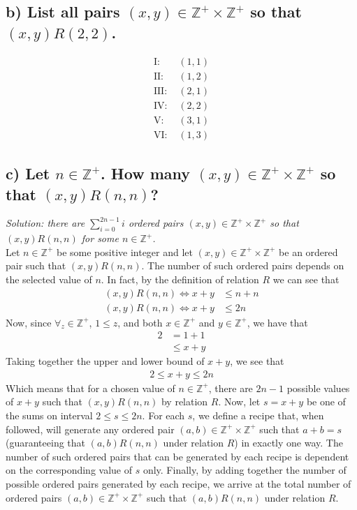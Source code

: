 \documentclass[11pt, letterpaper]{article}
\begin{document}
\subsection*{b) List all pairs $(x,y)\in\mathbb{Z^+}\times\mathbb{Z^+}$ so that $(x,y)R(2,2)$.}
\begin{align*}
    \text{I: } &(1,1)\\
    \text{II: } &(1,2)\\
    \text{III: } &(2,1)\\
    \text{IV: } &(2,2)\\
    \text{V: } &(3,1)\\
    \text{VI: } &(1,3)
\end{align*}
\subsection*{c) Let $n\in\mathbb{Z^+}$. How many $(x,y)\in\mathbb{Z^+}\times\mathbb{Z^+}$ so that $(x,y)R(n,n)$?}
{\large\it Solution: there are $\sum_{i=0}^{2n-1}i$ ordered pairs $(x,y)\in\mathbb{Z^+}\times\mathbb{Z^+}$ so that $(x,y)R(n,n)$ for some $n\in\mathbb{Z^+}$.}\\[0.25cm]
Let $n\in\mathbb{Z^+}$ be some positive integer and let $(x,y)\in\mathbb{Z^+}\times\mathbb{Z^+}$ be an ordered pair such that $(x,y)R(n,n)$. The number of such ordered pairs depends on the selected value of $n$. In fact, by the definition of relation $R$ we can see that
\begin{align*}
    (x,y)R(n,n)\iff x+y&\leq n+n\\
    (x,y)R(n,n)\iff x+y&\leq 2n
\end{align*}
Now, since $\forall_z\in\mathbb{Z^+}$, $1\leq z$, and both $x\in\mathbb{Z^+}$ and $y\in\mathbb{Z^+}$, we have that
\begin{align*}
    2&= 1+1\\
    &\leq x+y
\end{align*} 
Taking together the upper and lower bound of $x+y$, we see that
\begin{align*}
    2\leq x+y\leq 2n
\end{align*}
Which means that for a chosen value of $n\in\mathbb{Z^+}$, there are $2n-1$ possible values of $x+y$ such that $(x,y)R(n,n)$ by relation $R$.
Now, let $s=x+y$ be one of the sums on interval $2\leq s\leq 2n$. For each $s$, we define a recipe that, when followed, will generate any ordered pair $(a,b)\in\mathbb{Z^+}\times\mathbb{Z^+}$ such that $a+b=s$ (guaranteeing that $(a,b)R(n,n)$ under relation $R$) in exactly one way. 
The number of such ordered pairs that can be generated by each recipe is dependent on the corresponding value of $s$ only. Finally, by adding together the number of possible ordered pairs generated by each recipe, we arrive at the total number of ordered pairs $(a,b)\in\mathbb{Z^+}\times\mathbb{Z^+}$ such that $(a,b)R(n,n)$ under relation $R$.
\end{document}
